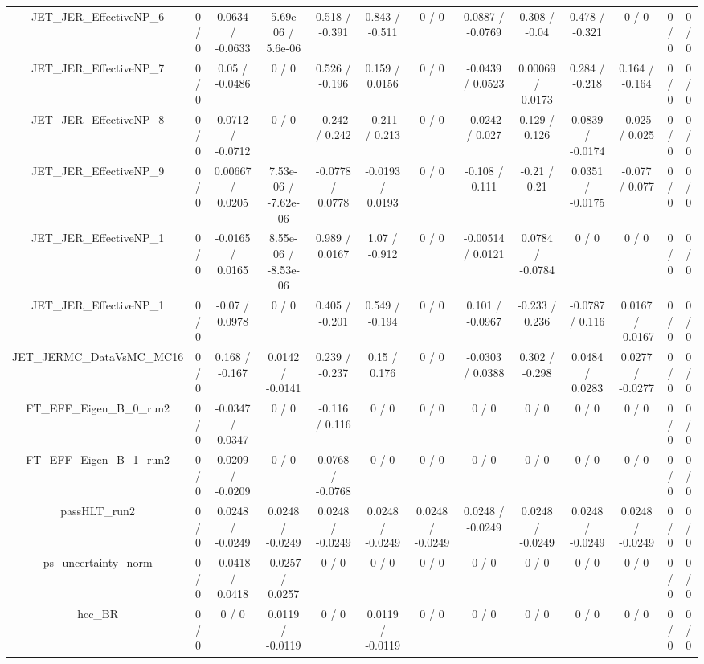 \documentclass[10pt]{article}
\begin{document}
\begin{table}[htbp]
\begin{center}
\begin{tabular}{|c|c|c|c|c|c|c|c|c|c|c|c|c|}
  JET_JER_EffectiveNP_6 & 0 / 0 & 0.0634 / -0.0633 & -5.69e-06 / 5.6e-06 & 0.518 / -0.391 & 0.843 / -0.511 & 0 / 0 & 0.0887 / -0.0769 & 0.308 / -0.04 & 0.478 / -0.321 & 0 / 0 & 0 / 0 & 0 / 0 \\ 
  JET_JER_EffectiveNP_7 & 0 / 0 & 0.05 / -0.0486 & 0 / 0 & 0.526 / -0.196 & 0.159 / 0.0156 & 0 / 0 & -0.0439 / 0.0523 & 0.00069 / 0.0173 & 0.284 / -0.218 & 0.164 / -0.164 & 0 / 0 & 0 / 0 \\ 
  JET_JER_EffectiveNP_8 & 0 / 0 & 0.0712 / -0.0712 & 0 / 0 & -0.242 / 0.242 & -0.211 / 0.213 & 0 / 0 & -0.0242 / 0.027 & 0.129 / 0.126 & 0.0839 / -0.0174 & -0.025 / 0.025 & 0 / 0 & 0 / 0 \\ 
  JET_JER_EffectiveNP_9 & 0 / 0 & 0.00667 / 0.0205 & 7.53e-06 / -7.62e-06 & -0.0778 / 0.0778 & -0.0193 / 0.0193 & 0 / 0 & -0.108 / 0.111 & -0.21 / 0.21 & 0.0351 / -0.0175 & -0.077 / 0.077 & 0 / 0 & 0 / 0 \\ 
  JET_JER_EffectiveNP_1 & 0 / 0 & -0.0165 / 0.0165 & 8.55e-06 / -8.53e-06 & 0.989 / 0.0167 & 1.07 / -0.912 & 0 / 0 & -0.00514 / 0.0121 & 0.0784 / -0.0784 & 0 / 0 & 0 / 0 & 0 / 0 & 0 / 0 \\ 
  JET_JER_EffectiveNP_1 & 0 / 0 & -0.07 / 0.0978 & 0 / 0 & 0.405 / -0.201 & 0.549 / -0.194 & 0 / 0 & 0.101 / -0.0967 & -0.233 / 0.236 & -0.0787 / 0.116 & 0.0167 / -0.0167 & 0 / 0 & 0 / 0 \\ 
  JET_JERMC_DataVsMC_MC16 & 0 / 0 & 0.168 / -0.167 & 0.0142 / -0.0141 & 0.239 / -0.237 & 0.15 / 0.176 & 0 / 0 & -0.0303 / 0.0388 & 0.302 / -0.298 & 0.0484 / 0.0283 & 0.0277 / -0.0277 & 0 / 0 & 0 / 0 \\ 
  FT_EFF_Eigen_B_0_run2 & 0 / 0 & -0.0347 / 0.0347 & 0 / 0 & -0.116 / 0.116 & 0 / 0 & 0 / 0 & 0 / 0 & 0 / 0 & 0 / 0 & 0 / 0 & 0 / 0 & 0 / 0 \\ 
  FT_EFF_Eigen_B_1_run2 & 0 / 0 & 0.0209 / -0.0209 & 0 / 0 & 0.0768 / -0.0768 & 0 / 0 & 0 / 0 & 0 / 0 & 0 / 0 & 0 / 0 & 0 / 0 & 0 / 0 & 0 / 0 \\ 
  passHLT_run2 & 0 / 0 & 0.0248 / -0.0249 & 0.0248 / -0.0249 & 0.0248 / -0.0249 & 0.0248 / -0.0249 & 0.0248 / -0.0249 & 0.0248 / -0.0249 & 0.0248 / -0.0249 & 0.0248 / -0.0249 & 0.0248 / -0.0249 & 0 / 0 & 0 / 0 \\ 
  ps_uncertainty_norm & 0 / 0 & -0.0418 / 0.0418 & -0.0257 / 0.0257 & 0 / 0 & 0 / 0 & 0 / 0 & 0 / 0 & 0 / 0 & 0 / 0 & 0 / 0 & 0 / 0 & 0 / 0 \\ 
  hcc_BR & 0 / 0 & 0 / 0 & 0.0119 / -0.0119 & 0 / 0 & 0.0119 / -0.0119 & 0 / 0 & 0 / 0 & 0 / 0 & 0 / 0 & 0 / 0 & 0 / 0 & 0 / 0 \\ 

\end{tabular}
\end{center}
\end{table}
\end{document}
